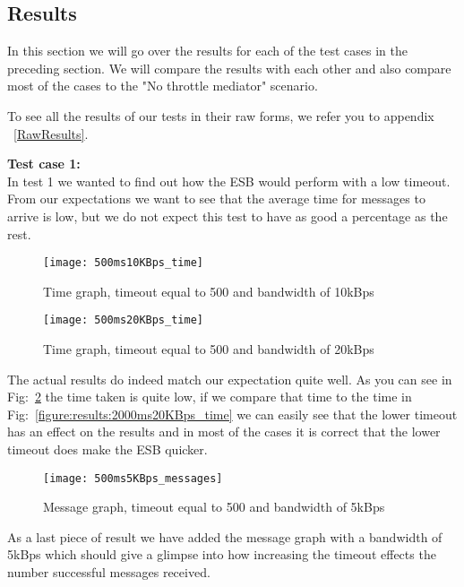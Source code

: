 \subsection{Results}\label{Testing:Results}
	In this section we will go over the results for each of the test cases in the preceding section. We will compare the results with each other and also compare most of the cases to the "No throttle mediator" scenario.
	
	\begin{shaded}
	To see all the results of our tests in their raw forms, we refer you to appendix ~\ref{RawResults}.
	\end{shaded}
	 
    \textbf{Test case 1:}\\
    In test 1 we wanted to find out how the ESB would perform with a low timeout. From our expectations we want to see that the average time for messages to arrive is low, but we do not expect this test to have as good a percentage as the rest. 
    
	\begin{figure}[H]
		\centering
		\texttt{[image: 500ms10KBps\_time]}
		\caption{Time graph, timeout equal to 500 and bandwidth of 10kBps} 
		\label{figure:results:500ms10KBps_time}
	\end{figure}
	
	\begin{figure}[H]
		\centering
		\texttt{[image: 500ms20KBps\_time]}
		\caption{Time graph, timeout equal to 500 and bandwidth of 20kBps} 
		\label{figure:results:500ms20KBps_time}
	\end{figure}
    
    The actual results do indeed match our expectation quite well. As you can see in Fig:~\ref{figure:results:500ms20KBps_time} the time taken is quite low, if we compare that time to the time in Fig:~\ref{figure:results:2000ms20KBps_time} we can easily see that the lower timeout has an effect on the results and in most of the cases it is correct that the lower timeout does make the ESB quicker.
    
    \begin{figure}[H]
		\centering
		\texttt{[image: 500ms5KBps\_messages]}
		\caption{Message graph, timeout equal to 500 and bandwidth of 5kBps} 
		\label{figure:results:500ms5KBps_messages}
	\end{figure}
	
	As a last piece of result we have added the message graph with a bandwidth of 5kBps which should give a glimpse into how increasing the timeout effects the number successful messages received.
    
